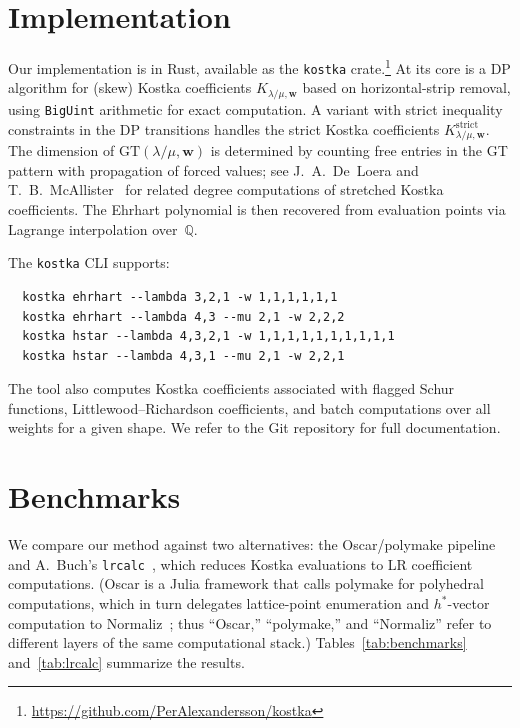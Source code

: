 \documentclass[11pt,reqno]{amsart}
\theoremstyle{definition}
\newcommand{\setQ}{\mathbb{Q}}
\newcommand{\GT}{\mathrm{GT}}
\newcommand{\lam}{\lambda}
\newcommand{\wt}{\mathbf{w}}
\begin{document}
\section{Implementation}\label{sec:implementation}

Our implementation is in Rust, available as the \texttt{kostka}
crate.\footnote{\url{https://github.com/PerAlexandersson/kostka}}
At its core is a DP algorithm for (skew) Kostka
coefficients $K_{\lam/\mu, \wt}$ based on horizontal-strip removal,
using \texttt{BigUint} arithmetic for exact computation.
A variant with strict inequality constraints in the DP transitions
handles the strict Kostka coefficients
$K^{\mathrm{strict}}_{\lam/\mu, \wt}$.
The dimension of $\GT(\lam/\mu, \wt)$ is determined by counting
free entries in the GT pattern with propagation of forced
values; see J.~A.~De~Loera and T.~B.~McAllister~\cite{DeLoeraMcAllister2006}
for related degree computations of stretched Kostka coefficients.
The Ehrhart polynomial is then recovered from evaluation points
via Lagrange interpolation over~$\setQ$.

The \texttt{kostka} CLI supports:
\begin{verbatim}
  kostka ehrhart --lambda 3,2,1 -w 1,1,1,1,1,1
  kostka ehrhart --lambda 4,3 --mu 2,1 -w 2,2,2
  kostka hstar --lambda 4,3,2,1 -w 1,1,1,1,1,1,1,1,1,1
  kostka hstar --lambda 4,3,1 --mu 2,1 -w 2,2,1
\end{verbatim}
The tool also computes Kostka coefficients associated with flagged
Schur functions, Littlewood--Richardson coefficients, and batch
computations over all weights for a given shape.  We refer to the
Git repository for full documentation.


\section{Benchmarks}\label{sec:benchmarks}

We compare our method against two alternatives:
the Oscar/polymake pipeline~\cite{GawrilowJoswig2000,OskarThesis}
and A.~Buch's \texttt{lrcalc}~\cite{Buch2000}, which reduces Kostka
evaluations to LR coefficient computations.
(Oscar is a Julia framework that calls polymake for polyhedral
computations, which in turn delegates lattice-point enumeration
and $h^*$-vector computation to Normaliz~\cite{BrunsIchim2010};
thus ``Oscar,'' ``polymake,'' and ``Normaliz'' refer to different
layers of the same computational stack.)
Tables~\ref{tab:benchmarks} and~\ref{tab:lrcalc} summarize the results.
\end{document}
